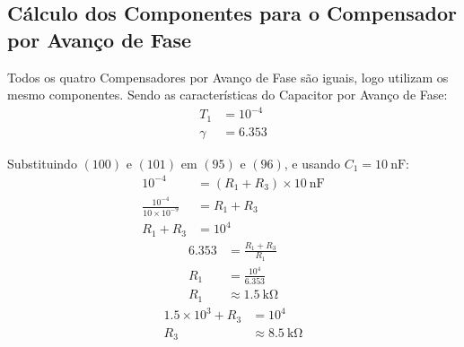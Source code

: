 \documentclass[a4paper]{article}
\begin{document}
\subsection{Cálculo dos Componentes para o Compensador por Avanço de Fase}
\par Todos os quatro Compensadores por Avanço de Fase são iguais, logo utilizam os mesmo componentes.  Sendo as características do Capacitor por Avanço de Fase:
\begin{align}
	T_1&=10^{-4}\\
	\gamma&=6.353
\end{align}
\par Substituindo $(100)$ e $(101)$ em $(95)$ e $(96)$, e usando $C_1=\SI{10}{\nano\farad}$:
\begin{align}
	10^{-4} &= (R_1+R_3)\times \SI{10}{\nano\farad}\\
	\frac{10^{-4}}{10\times10^{-9}} &= R_1+R_3 \\
	R_1+R_3  &= 10^4
\end{align}
	\vspace{0.5em}
\begin{align}
	6.353 &= \frac{R_1+R_3}{R_1} \\
    R_1 &= \frac{10^4}{6.353} \\
	R_1 &\approx \SI{1.5}{\kilo\ohm}
\end{align}
\vspace{0.5em}
\begin{align}
1.5\times10^3+R_3  &= 10^4\\
R_3  &\approx \SI{8.5}{\kilo\ohm}
\end{align}
\end{document}
